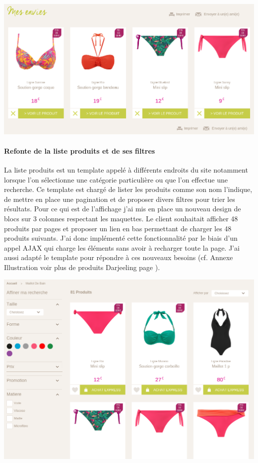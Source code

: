 \documentclass[a4paper,11pt,twoside]{report}
\begin{document}
	\begin{center}
	  \includegraphics[width=\textwidth]{images/darjeeling_wishlist.png} 
	  \label{darjeeling_wishlist}
	\end{center}
	
	\paragraph*{Refonte de la liste produits et de ses filtres}
	La liste produits est un template appelé à différents endroits du site notamment lorsque l'on sélectionne une catégorie particulière ou que l'on effectue une recherche. Ce template est chargé de lister les produits comme son nom l'indique, de mettre en place une pagination et de proposer divers filtres pour trier les résultats. Pour ce qui est de l'affichage j'ai mis en place un nouveau design de blocs sur 3 colonnes respectant les maquettes. 
	Le client souhaitait afficher 48 produits par pages et proposer un lien en bas permettant de charger les 48 produits suivants. J'ai donc implémenté cette fonctionnalité par le biais d'un appel AJAX qui charge les éléments sans avoir à recharger toute la page. J'ai aussi adapté le template pour répondre à ces nouveaux besoins (cf. Annexe Illustration voir plus de produits Darjeeling page \pageref{darjeeling_see_more_products}). 
	
	\begin{center}
	  \includegraphics[width=\textwidth]{images/darjeeling_list_products.png} 
	  \label{darjeeling_list_products}
	\end{center}
	
\end{document}
